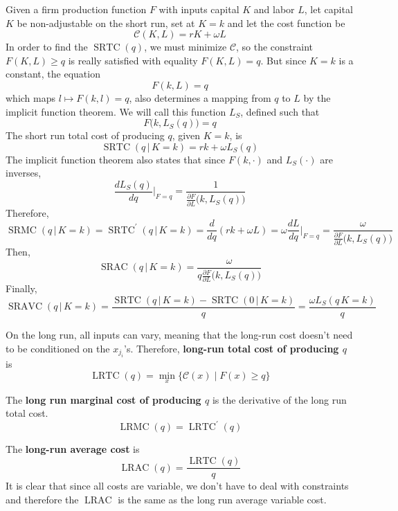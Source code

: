 \documentclass{article}
\DeclareMathOperator{\SRTC}{SRTC}
\DeclareMathOperator{\SRMC}{SRMC}
\DeclareMathOperator{\SRAC}{SRAC}
\DeclareMathOperator{\SRAVC}{SRAVC}
\DeclareMathOperator{\LRTC}{LRTC}
\DeclareMathOperator{\LRMC}{LRMC}
\DeclareMathOperator{\LRAC}{LRAC}
\begin{document}
      \begin{example}
        Given a firm production function $F$ with inputs capital $K$ and labor $L$, let capital $K$ be non-adjustable on the short run, set at $K=k$ and let the cost function be
        \[\mathcal{C}(K, L) = r K + \omega L\]
        In order to find the $\SRTC(q)$, we must minimize $\mathcal{C}$, so the constraint $F(K, L) \geq q$ is really satisfied with equality $F(K, L) = q$. But since $K=k$ is a constant, the equation
        \[F(k, L) = q\]
        which maps $l \mapsto F(k, l) = q$, also determines a mapping from $q$ to $L$ by the implicit function theorem. We will call this function $L_S$, defined such that
        \[F\big( k, L_S (q)\big) = q\]
        The short run total cost of producing $q$, given $K=k$, is 
        \[\SRTC(q\,|\,K=k) = r k + \omega L_S (q)\]
        The implicit function theorem also states that since $F(k, \cdot)$ and $L_S (\cdot)$ are inverses, 
        \[\frac{d L_S (q)}{d q} \bigg|_{F = q} = \frac{1}{\frac{\partial F}{\partial L} \big(k, L_S (q)\big)}\]
        Therefore, 
        \[\SRMC(q\,|\,K=k) = \SRTC^\prime (q\,|\,K=k) = \frac{d}{dq} (r k + \omega L) = \omega \frac{d L}{d q} \bigg|_{F=q} = \frac{\omega}{\frac{\partial F}{\partial L} \big(k, L_S (q)\big)}\]
        Then, 
        \[\SRAC(q\,|\,K=k) = \frac{\omega}{q \frac{\partial F}{\partial L} \big(k, L_S (q)\big)}\]
        Finally, 
        \[\SRAVC(q\,|\,K=k) = \frac{\SRTC(q\,|\,K=k) - \SRTC(0\,|\,K=k)}{q} = \frac{\omega L_S (q\,K=k)}{q}\]
      \end{example}

      \begin{definition}
        On the long run, all inputs can vary, meaning that the long-run cost doesn't need to be conditioned on the $x_{j_i}$'s. Therefore, \textbf{long-run total cost of producing $q$} is 
        \[\LRTC (q) = \min_{x} \{\mathcal{C}(x)\;|\; F(x) \geq q\}\]
      \end{definition}

      \begin{definition}
        The \textbf{long run marginal cost of producing $q$} is the derivative of the long run total cost. 
        \[\LRMC (q) = \LRTC^\prime (q)\]
      \end{definition}

      \begin{definition}
        The \textbf{long-run average cost} is 
        \[\LRAC (q) = \frac{\LRTC(q)}{q} \]
        It is clear that since all costs are variable, we don't have to deal with constraints and therefore the $\LRAC$ is the same as the long run average variable cost. 
      \end{definition}
\end{document}
